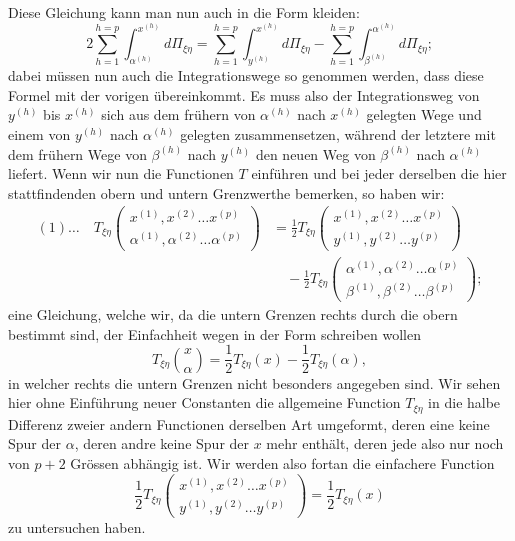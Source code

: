 \documentclass[10pt]{article}
\begin{document}
Diese Gleichung kann man nun auch in die Form kleiden:
\[
2\sum_{h=1}^{h=p}\int_{\alpha^{(h)}}^{x^{(h)}}d\Pi_{\xi\eta}
=\sum_{h=1}^{h=p}\int_{y^{(h)}}^{x^{(h)}}d\Pi_{\xi\eta}
-\sum_{h=1}^{h=p}\int_{\beta^{(h)}}^{\alpha^{(h)}}d\Pi_{\xi\eta};
\]
dabei müssen nun auch die Integrationswege so genommen werden, dass diese Formel mit der vorigen übereinkommt. Es muss also der Integrationsweg von \(y^{(h)}\) bis \(x^{(h)}\) sich aus dem frühern von \(\alpha^{(h)}\) nach \(x^{(h)}\) gelegten Wege und einem von \(y^{(h)}\) nach \(\alpha^{(h)}\) gelegten zusammensetzen, während der letztere mit dem frühern Wege von \(\beta^{(h)}\) nach \(y^{(h)}\) den neuen Weg von \(\beta^{(h)}\) nach \(\alpha^{(h)}\) liefert. Wenn wir nun die Functionen \(T\) einführen und bei jeder derselben die hier stattfindenden obern und untern Grenzwerthe bemerken, so haben wir:
\[
\begin{aligned}
(1)\ldots\quad
T_{\xi\eta}\begin{pmatrix}x^{(1)},x^{(2)}\ldots x^{(p)}\\ \alpha^{(1)},\alpha^{(2)}\ldots \alpha^{(p)}\end{pmatrix}
&=\frac12 T_{\xi\eta}\begin{pmatrix}x^{(1)},x^{(2)}\ldots x^{(p)}\\ y^{(1)},y^{(2)}\ldots y^{(p)}\end{pmatrix}\\
&\quad-\frac12 T_{\xi\eta}\begin{pmatrix}\alpha^{(1)},\alpha^{(2)}\ldots\alpha^{(p)}\\ \beta^{(1)},\beta^{(2)}\ldots\beta^{(p)}\end{pmatrix};
\end{aligned}
\]
eine Gleichung, welche wir, da die untern Grenzen rechts durch die obern bestimmt sind, der Einfachheit wegen in der Form schreiben wollen
\[
T_{\xi\eta}\binom{x}{\alpha}=\frac12T_{\xi\eta}(x)-\frac12T_{\xi\eta}(\alpha),
\]
in welcher rechts die untern Grenzen nicht besonders angegeben sind. Wir sehen hier ohne Einführung neuer Constanten die allgemeine Function \(T_{\xi\eta}\) in die halbe Differenz zweier andern Functionen derselben Art umgeformt, deren eine keine Spur der \(\alpha\), deren andre keine Spur der \(x\) mehr enthält, deren jede also nur noch von \(p+2\) Grössen abhängig ist. Wir werden also fortan die einfachere Function
\[
\frac12T_{\xi\eta}\begin{pmatrix}x^{(1)},x^{(2)}\ldots x^{(p)}\\ y^{(1)},y^{(2)}\ldots y^{(p)}\end{pmatrix}=\frac12T_{\xi\eta}(x)
\]
zu untersuchen haben.
\end{document}
